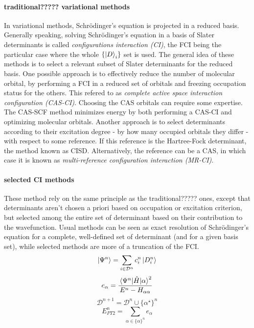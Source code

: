 \documentclass[./thesis.tex]{subfiles}
\begin{document}
\paragraph{traditional????? variational methods}
In variational methods, Schrödinger's equation is projected in a reduced basis.
Generally speaking, solving Schrödinger's equation in a basis of Slater determinants is called \emph{configurations interaction (CI)}, the FCI being the particular case where the whole $\{\ket D_i \}$ set is used. The general idea of these methods is to select a relevant subset of Slater determinants for the reduced basis.
One possible approach is to effectively reduce the number of molecular orbital, by performing a FCI in a reduced set of orbitals and freezing occupation status for the others. This refered to as \emph{complete active space interaction configuration (CAS-CI)}. Choosing the CAS orbitals can require some expertise. The CAS-SCF method minimizes energy by both performing a CAS-CI and optimizing molecular orbitals.
Another approach is to select determinants according to their excitation degree - by how many occupied orbitals they differ - with respect to some reference. If this reference is the Hartree-Fock determinant, the method known as CISD. Alternatively, the reference can be a CAS, in which case it is known as \emph{multi-reference configuration interaction (MR-CI)}.
\paragraph{selected CI methods}
These method rely on the same principle as the traditional????? ones, except that determinants aren't chosen a priori based on occupation or excitation criterion, but selected among the entire set of determinant based on their contribution to the wavefunction. Usual methods can be seen as exact resolution of Schrödinger's equation for a complete, well-defined set of determinant (and for a given basis set), while selected methods are more of a truncation of the FCI.
\begin{equation}
\ket{\Psi^{n}} = \sum_{i \in \mathcal{D}^n} c_i^{n} \ket{D^n_i}
\end{equation}
\begin{equation}
e_\alpha = \frac{\mel{\Psi^n}{\hat{H}}{\alpha}^2}{E^n - H_{\alpha \alpha}}
\end{equation}
\begin{equation}
\mathcal{D}^{n+1} = \mathcal{D}^{n} \cup \{ \alpha^\star \}^n
\end{equation}
\begin{equation}
E_{PT2}^n = \sum_{\alpha \in \{\alpha \}^n} e_\alpha
\end{equation}
\end{document}
